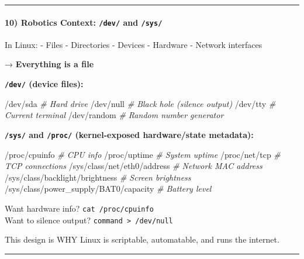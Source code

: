 \documentclass[
  english,
  paper=a4,
  oneside  ,captions=tableheading
]{scrartcl}
\newenvironment{Shaded}{}{}
\newcommand{\CommentTok}[1]{\textcolor[rgb]{0.38,0.63,0.69}{\textit{#1}}}
\newcommand{\ExtensionTok}[1]{#1}
\begin{document}
\begin{center}\rule{0.5\linewidth}{0.5pt}\end{center}

\paragraph{\texorpdfstring{10) Robotics Context: \texttt{/dev/} and
\texttt{/sys/}}{10) Robotics Context: /dev/ and /sys/}}\label{robotics-context-dev-and-sys}

In Linux: - Files - Directories - Devices - Hardware - Network
interfaces

→ \textbf{Everything is a file}

\textbf{\texttt{/dev/} (device files):}

\begin{Shaded}
\begin{Highlighting}[]
\ExtensionTok{/dev/sda}          \CommentTok{\# Hard drive}
\ExtensionTok{/dev/null}         \CommentTok{\# Black hole (silence output)}
\ExtensionTok{/dev/tty}          \CommentTok{\# Current terminal}
\ExtensionTok{/dev/random}       \CommentTok{\# Random number generator}
\end{Highlighting}
\end{Shaded}

\textbf{\texttt{/sys/} and \texttt{/proc/} (kernel-exposed
hardware/state metadata):}

\begin{Shaded}
\begin{Highlighting}[]
\ExtensionTok{/proc/cpuinfo}          \CommentTok{\# CPU info}
\ExtensionTok{/proc/uptime}           \CommentTok{\# System uptime}
\ExtensionTok{/proc/net/tcp}          \CommentTok{\# TCP connections}
\ExtensionTok{/sys/class/net/eth0/address}           \CommentTok{\# Network MAC address}
\ExtensionTok{/sys/class/backlight/brightness}       \CommentTok{\# Screen brightness}
\ExtensionTok{/sys/class/power\_supply/BAT0/capacity} \CommentTok{\# Battery level}
\end{Highlighting}
\end{Shaded}

Want hardware info? \texttt{cat\ /proc/cpuinfo}\\
Want to silence output? \texttt{command\ \textgreater{}\ /dev/null}

This design is WHY Linux is scriptable, automatable, and runs the
internet.

\begin{center}\rule{0.5\linewidth}{0.5pt}\end{center}
\end{document}
